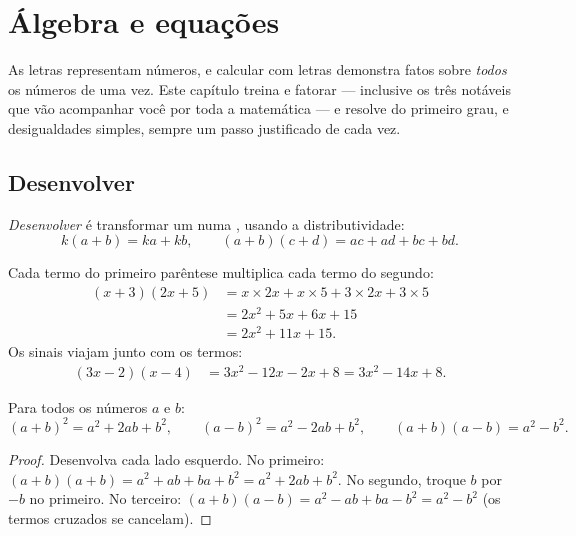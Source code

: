 \chapter{Álgebra e equações}\label{ch:g9:algebra}

As letras representam números, e calcular com letras demonstra fatos
sobre \emph{todos} os números de uma vez. Este capítulo treina
 e fatorar --- inclusive os três  notáveis que vão
acompanhar você por toda a matemática --- e resolve  do primeiro
grau,  e desigualdades simples, sempre um passo
justificado de cada vez.

\section{Desenvolver}

\begin{definition}[Desenvolvimento]\label{def:g9:algebra:expand}
\emph{Desenvolver} é transformar um  numa
, usando a distributividade:
\[
k(a + b) = ka + kb,
\qquad
(a + b)(c + d) = ac + ad + bc + bd .
\]
\end{definition}

\begin{example}\label{ex:g9:algebra:expand}
Cada termo do primeiro parêntese multiplica cada termo do segundo:
\begin{align*}
(x + 3)(2x + 5)
&= x \times 2x + x \times 5 + 3 \times 2x + 3 \times 5 \\
&= 2x^2 + 5x + 6x + 15 \\
&= 2x^2 + 11x + 15 .
\end{align*}
Os sinais viajam junto com os termos:
\begin{align*}
(3x - 2)(x - 4)
&= 3x^2 - 12x - 2x + 8
= 3x^2 - 14x + 8 .
\end{align*}
\end{example}

\begin{theorem}\label{thm:g9:algebra:identities}
Para todos os números $a$ e $b$:
\[
(a+b)^2 = a^2 + 2ab + b^2,
\qquad
(a-b)^2 = a^2 - 2ab + b^2,
\qquad
(a+b)(a-b) = a^2 - b^2 .
\]
\end{theorem}

\begin{proof}
Desenvolva cada lado esquerdo. No primeiro:
$(a+b)(a+b) = a^2 + ab + ba + b^2 = a^2 + 2ab + b^2$. No segundo,
troque $b$ por $-b$ no primeiro. No terceiro:
$(a+b)(a-b) = a^2 - ab + ba - b^2 = a^2 - b^2$ (os termos cruzados se
cancelam).
\end{proof}

